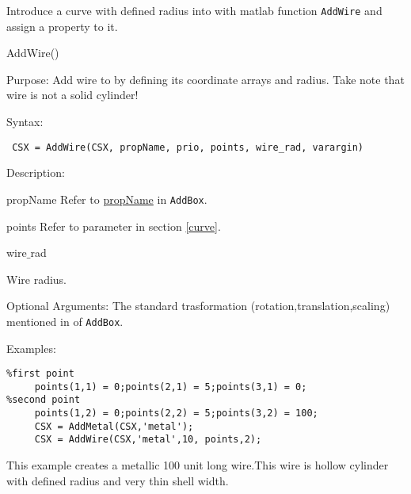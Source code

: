 Introduce a curve with defined radius into \hyperref[CSX]{} with matlab function \texttt{AddWire} and assign a property to it. 

\begin{FontNameFunct}{AddWire()}
\end{FontNameFunct}


\begin{FontDescr}{Purpose:}
Add wire to \hyperref[CSX]{} by defining its coordinate arrays and radius. Take note that wire is not a solid cylinder!  
\end{FontDescr}

\begin{FontDescr}{Syntax:}
\begin{lstlisting} 
 CSX = AddWire(CSX, propName, prio, points, wire_rad, varargin)
\end{lstlisting}
\end{FontDescr}

\begin{FontDescr}{Description:}

\begin{FontPara}{propName}
Refer to \hyperref[prim_Name]{propName} in \texttt{AddBox}. 
\end{FontPara}

\begin{FontPara}{points}
Refer to parameter \hyperref[points_curve]{} in section \ref{curve}.
\end{FontPara}

\textcolor{varcol}{wire$\_$rad}
\begin{myindentpar}
Wire radius. 
\end{myindentpar}
\end{FontDescr}

\begin{FontDescr}{Optional Arguments:}
The standard trasformation (rotation,translation,scaling) mentioned in  \hyperref[prim_transform]{} of \texttt{AddBox}.   
\end{FontDescr}

\begin{FontDescr}{Examples:}
\begin{lstlisting} 
%first point
     points(1,1) = 0;points(2,1) = 5;points(3,1) = 0; 
%second point
     points(1,2) = 0;points(2,2) = 5;points(3,2) = 100; 
     CSX = AddMetal(CSX,'metal'); 
     CSX = AddWire(CSX,'metal',10, points,2);
\end{lstlisting}
This example creates a metallic 100 unit long wire.This wire is hollow cylinder with defined radius and very thin shell width.   
\end{FontDescr}

